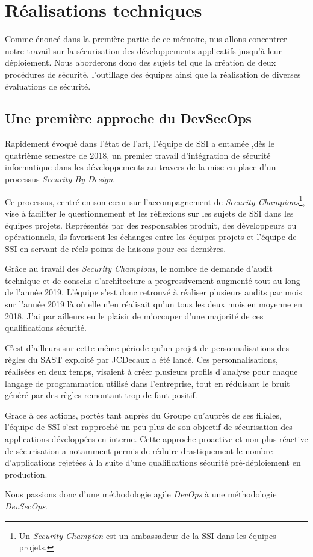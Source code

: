 \chapter{Réalisations techniques}
Comme énoncé dans la première partie de ce mémoire, nus allons concentrer notre travail sur la sécurisation des 
développements applicatifs jusqu'à leur déploiement. Nous aborderons donc des sujets tel que la création de deux 
procédures de sécurité, l'outillage des équipes ainsi que la réalisation de diverses évaluations de sécurité.

\section{Une première approche du DevSecOps}
Rapidement évoqué dans l'état de l'art, l'équipe de \ac{SSI} a entamée ,dès le quatrième semestre de 2018, un premier 
travail d'intégration de sécurité informatique dans les développements au travers de la mise en place d'un processus 
\emph{Security By Design}.

Ce processus, centré en son cœur sur l'accompagnement de \emph{Security Champions}\footnote{Un 
\emph{Security Champion} est un ambassadeur de la \ac{SSI} dans les équipes projets.}, vise à faciliter le questionnement
et  les réflexions sur les sujets de \ac{SSI} dans les équipes projets. Représentés par des responsables produit, des 
développeurs ou opérationnels, ils favorisent les échanges entre les équipes projets et l'équipe de \ac{SSI} en servant 
de réels points de liaisons pour ces dernières.

Grâce au travail des \emph{Security Champions}, le nombre de demande d'audit technique et de conseils d'architecture
a progressivement augmenté tout au long de l'année 2019. L'équipe s'est donc retrouvé à réaliser plusieurs audits par 
mois sur l'année 2019 là où elle n'en réalisait qu'un tous les deux mois en moyenne en 2018. J'ai par ailleurs eu le 
plaisir de m'occuper d'une majorité de ces qualifications sécurité.

C'est d'ailleurs sur cette même période qu'un projet de personnalisations des règles du \ac{SAST} exploité par JCDecaux 
a été lancé. Ces personnalisations, réalisées en deux temps, visaient à créer plusieurs profils d'analyse pour chaque 
langage de programmation utilisé dans l'entreprise, tout en réduisant le bruit généré par des règles remontant trop de 
faut positif.

Grace à ces actions, portés tant auprès du Groupe qu'auprès de ses filiales, l'équipe de \ac{SSI} s'est rapproché un peu
plus de son objectif de sécurisation des applications développées en interne. Cette approche proactive et non plus 
réactive de sécurisation a notamment permis de réduire drastiquement le nombre d'applications rejetées à la suite d'une 
qualifications sécurité pré-déploiement en production.

Nous passions donc d'une méthodologie agile \emph{DevOps} à une méthodologie \emph{DevSecOps}.

\newpage